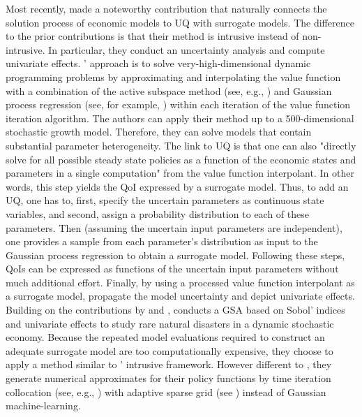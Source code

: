 \newline
Most recently, \cite{Scheidegger.2019} made a noteworthy contribution that naturally connects the solution process of economic models to UQ with surrogate models. The difference to the prior contributions is that their method is intrusive instead of non-intrusive. In particular, they conduct an uncertainty analysis and compute univariate effects. \citeauthor{Scheidegger.2019}' approach is to solve very-high-dimensional dynamic programming problems by approximating and interpolating the value function with a combination of the active subspace method (see, e.g., \cite{Constantine.2015}) and Gaussian process regression (see, for example, \cite{Rasmussen.2005}) within each iteration of the value function iteration algorithm. The authors can apply their method up to a 500-dimensional stochastic growth model. Therefore, they can solve models that contain substantial parameter heterogeneity.
The link to UQ is that one can also "directly solve for all possible steady state policies as a function of the economic states and parameters in a single computation" \cite[p.~4]{Scheidegger.2019} from the value function interpolant. In other words, this step yields the QoI expressed by a surrogate model. Thus, to add an UQ, one has to, first, specify the uncertain parameters as continuous state variables, and second, assign a probability distribution to each of these parameters. Then (assuming the uncertain input parameters are independent), one provides a sample from each parameter's distribution as input to the Gaussian process regression to obtain a surrogate model. Following these steps, QoIs can be expressed as functions of the uncertain input parameters without much additional effort. Finally, by using a processed value function interpolant as a surrogate model, \citeauthor{Scheidegger.2019} propagate the model uncertainty and depict univariate effects.\\
\newline
Building on the contributions by \cite{Harenberg.2019} and \cite{Scheidegger.2019}, \cite{Usui.2019} conducts a GSA based on Sobol' indices and univariate effects to study rare natural disasters in a dynamic stochastic economy. Because the repeated model evaluations required to construct an adequate surrogate model are too computationally expensive, they choose to apply a  method similar to \citeauthor{Scheidegger.2019}' intrusive framework. However different to \cite{Scheidegger.2019}, they generate numerical approximates for their policy functions by time iteration collocation (see, e.g., \cite{Judd.1998}) with adaptive sparse grid (see  \cite{Scheidegger.2018}) instead of Gaussian machine-learning.\\
